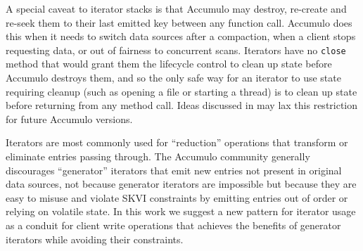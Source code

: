 A special caveat to iterator stacks is that Accumulo may destroy, re-create 
and re-seek them to their last emitted key between any function call.
Accumulo does this when it needs to switch data sources after a compaction, 
when a client stops requesting data, or out of fairness to concurrent scans.
Iterators have no \texttt{close} method that would grant them the lifecycle control to clean up state
before Accumulo destroys them, and so the only safe way for an 
iterator to use state requiring cleanup (such as opening a file or starting a thread)
is to clean up state before returning from any method call.
Ideas discussed in \cite{ACCUMULO-3751} may lax this restriction for future Accumulo versions.


Iterators are most commonly used for ``reduction'' operations that transform
or eliminate entries passing through.  The Accumulo community generally discourages ``generator'' iterators 
that emit new entries not present in original data sources, not because generator iterators are impossible 
but because they are easy to misuse and violate SKVI constraints by emitting entries out of order or 
relying on volatile state.
In this work we suggest a new pattern for iterator usage as a conduit for client write operations 
that achieves the benefits of generator iterators while avoiding their constraints.

